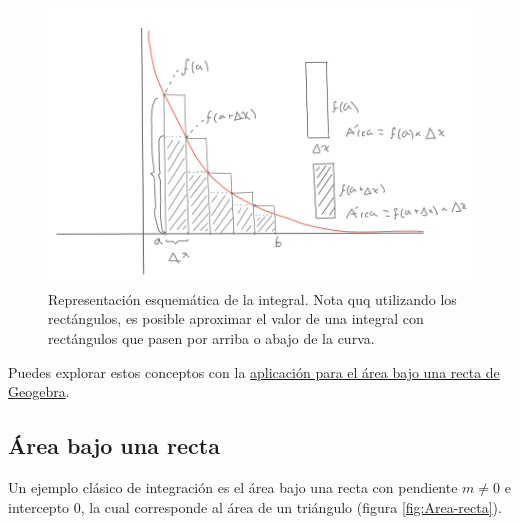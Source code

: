 \documentclass[
]{book}
\begin{document}
\begin{figure}

{\centering \includegraphics[width=12.4in]{Unidad-III/Esquema-integral} 

}

\caption{Representación esquemática de la integral. Nota quq utilizando los rectángulos, es posible aproximar el valor de una integral con rectángulos que pasen por arriba o abajo de la curva.}\label{fig:La-integral}
\end{figure}

Puedes explorar estos conceptos con la \href{https://www.geogebra.org/classic/wmpqmr4a}{aplicación para el área bajo una recta de Geogebra}.

\hypertarget{uxe1rea-bajo-una-recta}{%
\subsection{Área bajo una recta}\label{uxe1rea-bajo-una-recta}}

Un ejemplo clásico de integración es el área bajo una recta con pendiente \(m \neq 0\) e intercepto \(0\), la cual corresponde al área de un triángulo (figura \ref{fig:Area-recta}).
\end{document}

